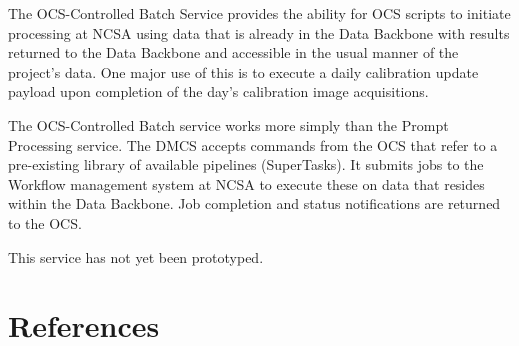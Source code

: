 \documentclass[DM,lsstdraft,toc]{lsstdoc}
\begin{document}
The OCS-Controlled Batch Service provides the ability for OCS scripts to
initiate processing at NCSA using data that is already in the Data Backbone
with results returned to the Data Backbone and accessible in the usual manner
of the project’s data.  One major use of this is to execute a daily calibration
update payload upon completion of the day's calibration image acquisitions.

The OCS-Controlled Batch service works more simply than the Prompt Processing
service.  The DMCS accepts commands from the OCS that refer to a pre-existing
library of available pipelines (SuperTasks).  It submits jobs to the Workflow
management system at NCSA to execute these on data that resides within the Data
Backbone.  Job completion and status notifications are returned to the OCS.

This service has not yet been prototyped.

\section{References\label{references}}
\renewcommand{\refname}{}

\end{document}
